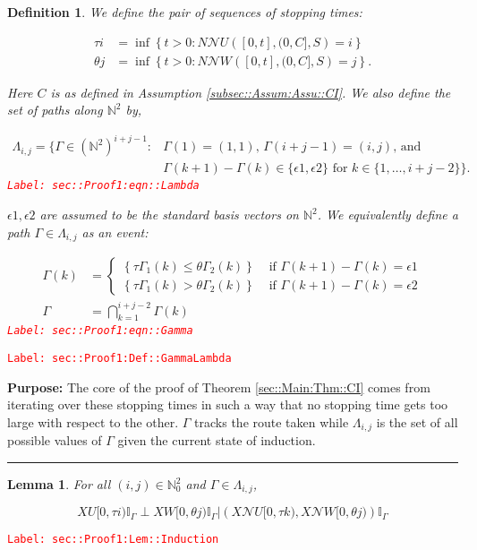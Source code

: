 \documentclass[12pt]{article}
\newcommand{\mb}{\mathbb}
\newcommand{\mc}{\mathcal}
\newcommand{\te}{\text}
\newcommand{\ep}{\epsilon}
\newcommand{\tr}{\textcolor{red}}
\newcommand{\labe}[1]{\tr{\texttt{Label: #1}}}
\newcommand{\purpose}{\textbf{Purpose: }}
\newcommand{\lin}{\rule{\linewidth}{0.4 pt}}
\renewcommand{\U}{U}							%
\newcommand{\UU}{W}								%
\renewcommand{\S}{S}							%
\newcommand{\ev}{\ep}							%
\renewcommand{\t}{t}							%
\newcommand{\X}{X}								%
\newcommand{\neigh}{\mc{N}}						%
\newcommand{\const}{C}							%
\newcommand{\poiss}{N}							%
\newcommand{\rt}{\tau}							%
\newcommand{\rtt}{\theta}						%
\renewcommand{\it}{k}							%
\newcommand{\apath}{\Gamma}						%
\newcommand{\pathset}[2]{\Lambda_{#1,#2}}		%
\newtheorem{lem}[thms]{Lemma}
\newtheorem{defn}[thms]{Definition}
\begin{document}
\begin{defn}
We define the pair of sequences of stopping times:

\begin{align*}
\rt{i} &= \inf \left\{\t > 0: \poiss{\neigh{\U}}\left([0,\t],(0,\const{}],\S\right) = i\right\}\\
\rtt{j} &= \inf \left\{\t > 0: \poiss{\neigh{\UU}}\left([0,\t],(0,\const{}],\S\right) = j\right\}.
\end{align*}

Here \(\const{}\) is as defined in Assumption \ref{subsec::Assum:Assu::CI}. We also define the set of paths along \(\mb{N}^2\) by,

\begin{align}
\pathset{i}{j} = \{\apath \in (\mb{N}^2)^{i+j-1}: &\apath(1) = (1,1)\te{, } \apath(i+j-1) = (i,j)\te{, and } \nonumber\\
&\apath(\it+1) - \apath(\it)\in \{\ev{1},\ev{2}\}\te{ for }\it\in \{1,\dots, i+j-2\}\}.
\label{sec::Proof1:eqn::Lambda}
\end{align}
\labe{sec::Proof1:eqn::Lambda}

\(\ev{1},\ev{2}\) are assumed to be the standard basis vectors on \(\mb{N}^2\). We equivalently define a path \(\apath \in \pathset{i}{j}\) as an event:

\begin{align}
\apath(\it) &= \begin{cases}
\left\{\rt{\apath_1(\it)} \leq \rtt{\apath_2(\it)}\right\} &\te{ if } \apath(\it+1) - \apath(\it) = \ev{1}\\
\left\{\rt{\apath_1(\it)} > \rtt{\apath_2(\it)}\right\} &\te{ if } \apath(\it+1) - \apath(\it) = \ev{2}
\end{cases}\\
\apath &= \bigcap_{\it=1}^{i+j-2} \apath(\it)
\label{sec::Proof1:eqn::Gamma}
\end{align}
\labe{sec::Proof1:eqn::Gamma}
\label{sec::Proof1:Def::GammaLambda}
\end{defn}
\labe{sec::Proof1:Def::GammaLambda}

\purpose The core of the proof of Theorem \ref{sec::Main:Thm::CI} comes from iterating over these stopping times in such a way that no stopping time gets too large with respect to the other. \(\apath\) tracks the route taken while \(\pathset{i}{j}\) is the set of all possible values of \(\apath\) given the current state of induction.

\lin

\begin{lem}
For all \((i,j)\in \mb{N}_0^2\) and \(\apath \in \pathset{i}{j}\),

\[\X{\U}{[0,\rt{i})}\mb{I}_{\apath}\perp \X{\UU}{[0,\rtt{j})}\mb{I}_{\apath}|\left(\X{\neigh{\U}}{[0,\rt{\it})},\X{\neigh{\UU}}{[0,\rtt{j})}\right)\mb{I}_{\apath}\]
\label{sec::Proof1:Lem::Induction}
\end{lem}
\labe{sec::Proof1:Lem::Induction}
\end{document}
